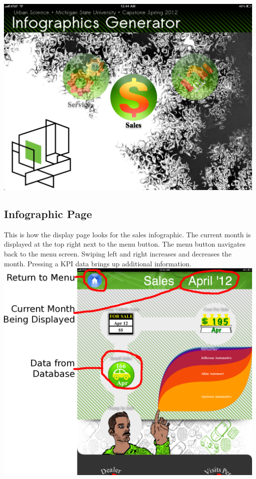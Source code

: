 \documentclass[11pt,a4paper,oneside]{article}
\begin{document}
\includegraphics[width=1\textwidth]{images/main-menu.png}\\

\subsection{Infographic Page}

This is how the display page looks for the sales infographic.  The current month is displayed at the top right next to the menu button.  The menu button navigates back to the menu screen.  Swiping left and right increases and decreases the month.  Pressing a KPI data brings up additional information.\\

\includegraphics[width=1\textwidth]{images/labels.png}\\
\end{document}
